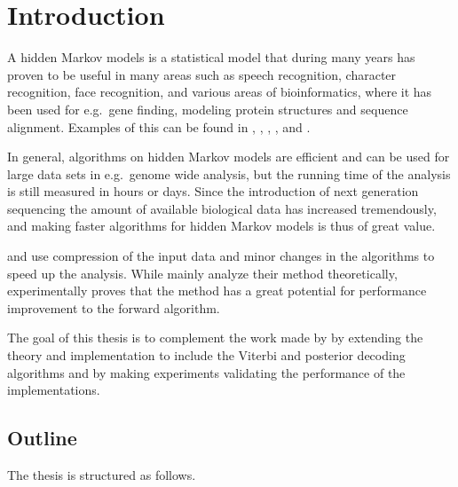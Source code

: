 \chapter{Introduction}

A hidden Markov models is a statistical model that during many years has proven
to be useful in many areas such as speech recognition, character recognition,
face recognition, and various areas of bioinformatics, where it has been
used for e.g.\ gene finding, modeling protein structures and sequence
alignment. Examples of this can be found in \citet{rabiner1989tutorial},
\citet{agazzi1993hidden}, \citet{nefian1998hidden},
\citet{burge1997prediction}, and \citet{eddy1998profile}.

In general, algorithms on hidden Markov models are efficient and can be used
for large data sets in e.g.\ genome wide analysis, but the running time of the
analysis is still measured in hours or days. Since the introduction of next
generation sequencing the amount of available biological data has increased
tremendously, and making faster algorithms for hidden Markov models is thus of
great value.

\citet{lifshits2009speeding} and \citet{sand2013ziphmmlib} use compression of
the input data and minor changes in the algorithms to speed up the
analysis. While \citet{lifshits2009speeding} mainly analyze their method
theoretically, \citet{sand2013ziphmmlib} experimentally proves that the method
has a great potential for performance improvement to the forward algorithm.

The goal of this thesis is to complement the work made by \citet{sand2013ziphmmlib}
by extending the theory and implementation to include the Viterbi and posterior decoding
algorithms and by making experiments validating the performance of the implementations.

\section{Outline}

The thesis is structured as follows.

